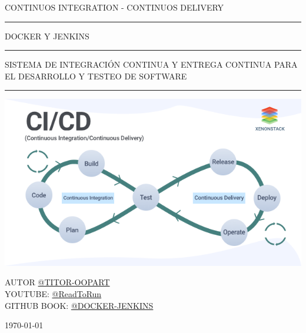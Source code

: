 \begin{titlepage}
	\noindent
	\centering
	\Large {CONTINUOS INTEGRATION - CONTINUOS DELIVERY}
	\begin{center}
		\centering
		\rule{150 mm}{0.1 mm}
		\Large {DOCKER Y JENKINS\\}
		
		\rule{150 mm}{0.1 mm}
		\large {{SISTEMA DE INTEGRACIÓN CONTINUA Y ENTREGA CONTINUA PARA EL DESARROLLO Y TESTEO DE SOFTWARE}}
		\rule{150 mm}{0.4 mm}
		\vspace{1 cm}
		\vspace{0.3 cm}
		\includegraphics[width=1\textwidth]{image/cover.png}
	\end{center}
	\vspace{0.3 cm}
	\begin{center}
		{\large AUTOR
			{\href{https://github.com/titor-oopart/}{@TITOR-OOPART}}}	\\
		{\large YOUTUBE:	{\href{https://www.youtube.com/@ReadToRun}{@ReadToRun}}}	\\
		{\large GITHUB BOOK:  	{\href{https://github.com/titor-oopart/jenkins_docker_menos_a_mas}{@DOCKER-JENKINS}}}\\
	\end{center}
	\vspace{0.5 cm}
	\vfill
	\begin{center}
		\large\today
	\end{center}
\end{titlepage}